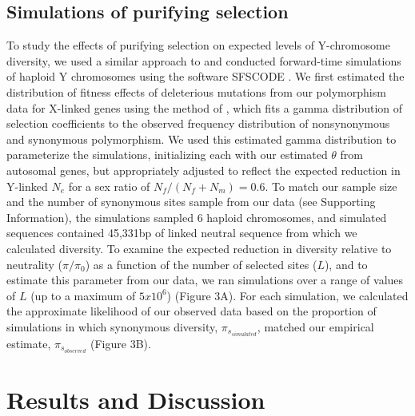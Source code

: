 \documentclass[9pt,twocolumn,twoside]{gsajnl}
\begin{document}
\subsection*{Simulations of purifying selection}
To study the effects of purifying selection on expected levels of Y-chromosome diversity, we used a similar approach to \citep{Wilsonsayres2014} and conducted forward-time simulations of haploid Y chromosomes using the software SFSCODE \citep{hernandez2008flexible}. We first estimated the distribution of fitness effects of deleterious mutations from our polymorphism data for X-linked genes using the method of \citep{keightley2007joint}, which fits a gamma distribution of selection coefficients to the observed frequency distribution of nonsynonymous and synonymous polymorphism. We used this estimated gamma distribution to parameterize the simulations, initializing each with our estimated $\theta$ from autosomal genes, but appropriately adjusted to reflect the expected reduction in Y-linked $N_{e}$ for a sex ratio of $N_{f}/(N_{f}+N_{m})=0.6$. To match our sample size and the number of synonymous sites sample from our data (see Supporting Information), the simulations sampled 6 haploid chromosomes, and simulated sequences contained 45,331bp of linked neutral sequence from which we calculated diversity. To examine the expected reduction in diversity relative to neutrality ($\pi/\pi_{0}$) as a function of the number of selected sites ($L$), and to estimate this parameter from our data, we ran simulations over a range of values of $L$ (up to a maximum of $5x10^{6}$) (Figure 3A). For each simulation, we calculated the approximate likelihood of our observed data based on the proportion of simulations in which synonymous diversity, $\pi_{s}_{simulated}$, matched our empirical estimate, $\pi_{s}_{observed}$ (Figure 3B).

\section*{Results and Discussion}
\end{document}

